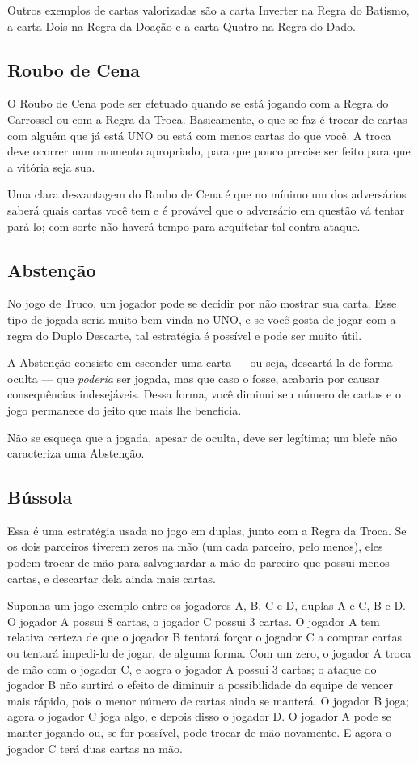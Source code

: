 Outros exemplos de cartas valorizadas são a carta Inverter na Regra do Batismo, a carta Dois na Regra da Doação e a carta Quatro na Regra do Dado.

\subsection{Roubo de Cena}

O Roubo de Cena pode ser efetuado quando se está jogando com a Regra do Carrossel ou com a Regra da Troca. Basicamente, o que se faz é trocar de cartas com alguém que já está UNO ou está com menos cartas do que você. A troca deve ocorrer num momento apropriado, para que pouco precise ser feito para que a vitória seja sua.

Uma clara desvantagem do Roubo de Cena é que no mínimo um dos adversários saberá quais cartas você tem e é provável que o adversário em questão vá tentar pará-lo; com sorte não haverá tempo para arquitetar tal contra-ataque.

\subsection{Abstenção}

No jogo de Truco, um jogador pode se decidir por não mostrar sua carta. Esse tipo de jogada seria muito bem vinda no UNO, e se você gosta de jogar com a regra do Duplo Descarte, tal estratégia é possível e pode ser muito útil.

A Abstenção consiste em esconder uma carta --- ou seja, descartá-la de forma oculta --- que \emph{poderia} ser jogada, mas que caso o fosse, acabaria por causar consequências indesejáveis. Dessa forma, você diminui seu número de cartas e o jogo permanece do jeito que mais lhe beneficia.

Não se esqueça que a jogada, apesar de oculta, deve ser legítima; um blefe não caracteriza uma Abstenção.

\subsection{Bússola}

Essa é uma estratégia usada no jogo em duplas, junto com a Regra da Troca. Se os dois parceiros tiverem zeros na mão (um cada parceiro, pelo menos), eles podem trocar de mão para salvaguardar a mão do parceiro que possui menos cartas, e descartar dela ainda mais cartas.

Suponha um jogo exemplo entre os jogadores A, B, C e D, duplas A e C, B e D. O jogador A possui 8 cartas, o jogador C possui 3 cartas. O jogador A tem relativa certeza de que o jogador B tentará forçar o jogador C a comprar cartas ou tentará impedi-lo de jogar, de alguma forma. Com um zero, o jogador A troca de mão com o jogador C, e aogra o jogador A possui 3 cartas; o ataque do jogador B não surtirá o efeito de diminuir a possibilidade da equipe de vencer mais rápido, pois o menor número de cartas ainda se manterá. O jogador B joga; agora o jogador C joga algo, e depois disso o jogador D.  O jogador A pode se manter jogando ou, se for possível, pode trocar de mão novamente. E agora o jogador C terá duas cartas na mão.

